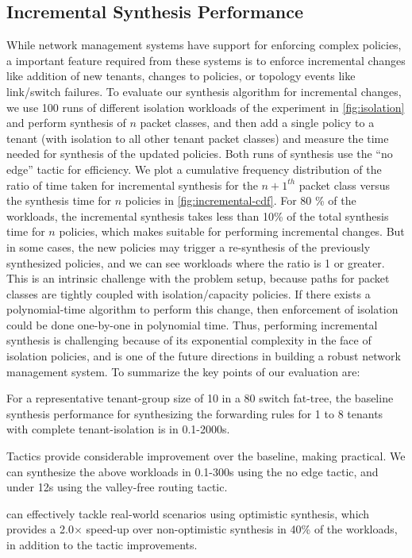 \subsection{Incremental Synthesis
  Performance} \label{sec:incrementaleval} While network management
systems have support for enforcing complex policies, a important
feature required from these systems is to enforce incremental changes
like addition of new tenants, changes to policies, or topology events
like link/switch failures. To evaluate our synthesis algorithm for
incremental changes, we use 100 runs of different isolation workloads
of the experiment in \cref{fig:isolation} and perform synthesis of $n$
packet classes, and then add a single policy to a tenant (with
isolation to all other tenant packet classes) and measure the time
needed for synthesis of the updated policies. Both runs of synthesis
use the ``no edge'' tactic for efficiency. We plot a cumulative
frequency distribution of the ratio of time taken for incremental
synthesis for the $n+1^{th}$ packet class versus the synthesis time
for $n$ policies in \cref{fig:incremental-cdf}. For 80 \% of the
workloads, the incremental synthesis takes less than 10\% of the total
synthesis time for $n$ policies, which makes \Name suitable for
performing incremental changes. But in some cases, the new policies
may trigger a re-synthesis of the previously synthesized policies, and
we can see workloads where the ratio is 1 or greater. This is an
intrinsic challenge with the problem setup, because paths for packet
classes are tightly coupled with isolation/capacity policies. If there
exists a polynomial-time algorithm to perform this change, then
enforcement of isolation could be done one-by-one in polynomial time.
Thus, performing incremental synthesis is challenging because of its
exponential complexity in the face of isolation policies, and is one
of the future directions in building a robust network management
system. \newline To summarize the key points of our evaluation are:
\begin{compactitemize}
\item For a representative tenant-group size of 10 in a 80 switch
  fat-tree, the baseline synthesis performance for synthesizing the
  forwarding rules for 1 to 8 tenants with complete tenant-isolation
  is in 0.1-2000s.
      \item Tactics provide considerable improvement over the
        baseline, making \Name practical.  We can synthesize the above
        workloads in 0.1-300s using the no edge tactic,
        and under 12s using the valley-free routing tactic.
      \item \Name can effectively tackle real-world scenarios using
        optimistic synthesis, which provides a 2.0$\times$ speed-up
        over non-optimistic synthesis in 40\% of the workloads, in
        addition to the tactic improvements.
\end{compactitemize}


